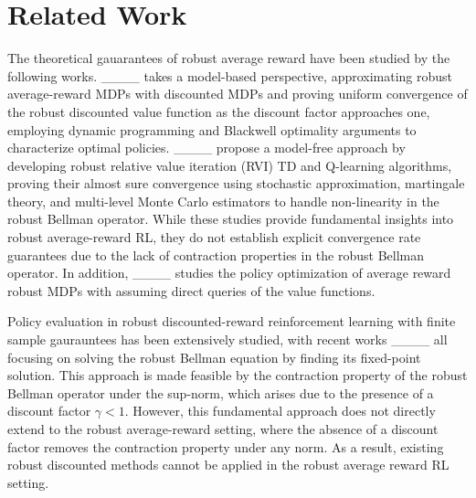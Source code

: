 \section{Related Work}
The theoretical gauarantees of robust average reward have been studied by the following works. ____ takes a model-based perspective, approximating robust average-reward MDPs with discounted MDPs and proving uniform convergence of the robust discounted value function as the discount factor approaches one, employing dynamic programming and Blackwell optimality arguments to characterize optimal policies. ____ propose a model-free approach by developing robust relative value iteration (RVI) TD and Q-learning algorithms, proving their almost sure convergence using stochastic approximation, martingale theory, and multi-level Monte Carlo estimators to handle non-linearity in the robust Bellman operator. While these studies provide fundamental insights into robust average-reward RL, they do not establish explicit convergence rate guarantees due to the lack of contraction properties in the robust Bellman operator. In addition, ____ studies the policy optimization of average reward robust MDPs with assuming direct queries of the value functions.



Policy evaluation in robust discounted-reward reinforcement learning with finite sample gaurauntees has been extensively studied, with recent works ____ all focusing on solving the robust Bellman equation by finding its fixed-point solution. This approach is made feasible by the contraction property of the robust Bellman operator under the sup-norm, which arises due to the presence of a discount factor $\gamma < 1$. However, this fundamental approach does not directly extend to the robust average-reward setting, where the absence of a discount factor removes the contraction property under any norm. As a result, existing robust discounted methods cannot be applied in the robust average reward RL setting.